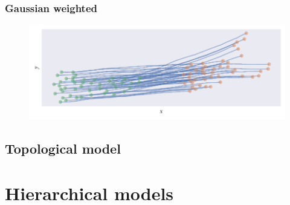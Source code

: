 \subsubsection{Gaussian weighted}

\begin{figure}[tb]
    \includegraphics{gauss_sim.pdf}
    \caption{}
\end{figure}

\subsection{Topological model}

\section{Hierarchical models}
